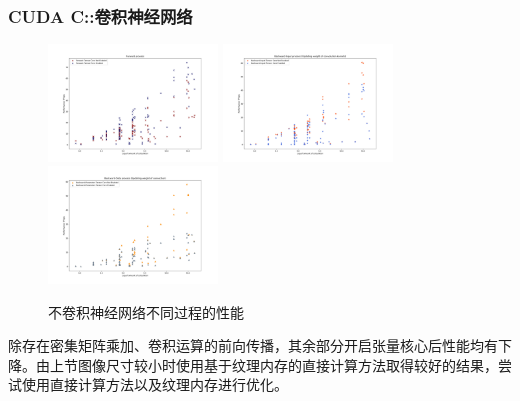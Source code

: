 \documentclass[10pt,aspectratio=169,mathserif]{beamer}
\begin{document}
	\begin{frame}
		\frametitle{CUDA C::卷积神经网络}
		\begin{figure}
			\centering
			\includegraphics[width=4.5cm]{figures/CNN-HALF-FWD.jpg}
			\includegraphics[width=4.5cm]{figures/CNN-HALF-BWD-FILTER.jpg}
			\includegraphics[width=4.5cm]{figures/CNN-HALF-BWD-DATA.jpg}
			\caption{不卷积神经网络不同过程的性能}\label{Fig.CONV3PART}
		\end{figure}
		除存在密集矩阵乘加、卷积运算的前向传播，其余部分开启张量核心后性能均有下降。由上节图像尺寸较小时使用基于纹理内存的直接计算方法取得较好的结果，尝试使用直接计算方法以及纹理内存进行优化。
	\end{frame}
	
\end{document}
